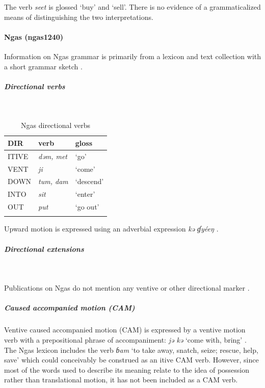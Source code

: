 The verb \textit{seet} is glossed `buy' and `sell'. There is no evidence of a grammaticalized means of distinguishing the two interpretations.

\paragraph*{Ngas (ngas1240)} \label{ngas} Information on Ngas grammar is primarily from a lexicon and text collection with a short grammar sketch \citep{jungraithmayrNgasLanguageShik2016}. 

\subparagraph{Directional verbs}~



\begin{table}[H]
	\caption{Ngas directional verbs} 
	\label{tab:ngasV}
	\begin{tabular}{lll} %
		\lsptoprule
		DIR & verb & gloss   \\ %
		\midrule
		ITIVE & \textit{dəm, met} & `go' \\
		VENT & \textit{ji} & `come' \\
		DOWN & \textit{tum, dam} & `descend' \\
		INTO& \textit{sit} & `enter' \\
		OUT & \textit{put} & `go out' \\
		\lspbottomrule
	\end{tabular}
\end{table}

Upward motion is expressed using an adverbial expression \textit{kə ɠyéeŋ} \citep[104]{jungraithmayrNgasLanguageShik2016}.

\subparagraph{Directional extensions}~



Publications on Ngas do not mention any ventive or other directional marker \citep{burquestGrammarAngas1973,jungraithmayrNgasLanguageShik2016}. 

\subparagraph{Caused accompanied motion (CAM)}



Ventive caused accompanied motion (CAM) is expressed by a ventive motion verb with a prepositional phrase of accompaniment: \textit{jə kə} `come with, bring' \citep[182]{jungraithmayrNgasLanguageShik2016}. The Ngas lexicon includes the verb \textit{ɓam} `to take away, snatch, seize; rescue, help, save' \citep[162]{jungraithmayrNgasLanguageShik2016} which could conceivably be construed as an itive CAM verb. However, since most of the words used to describe its meaning relate to the idea of possession rather than translational motion, it has not been included as a CAM verb.

